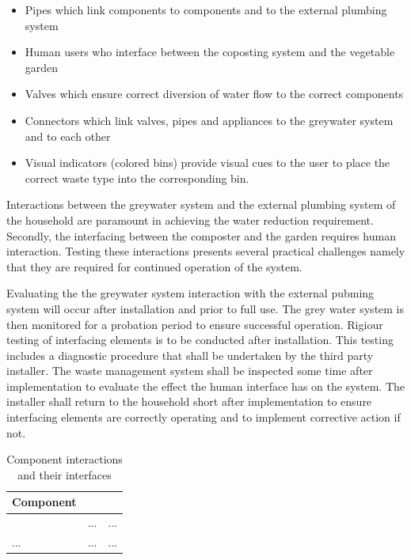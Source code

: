 \documentclass[a4paper,11pt,fleqn]{report}
\begin{document}
\begin{itemize}
\item Pipes which link components to components and to the external plumbing system
\item Human users who interface between the coposting system and the vegetable garden
\item Valves which ensure correct diversion of water flow to the correct components
\item Connectors which link valves, pipes and appliances to the greywater system and to each other
\item Visual indicators (colored bins) provide visual cues to the user to place the correct waste type into the corresponding bin.
\end{itemize}

Interactions between the greywater system and the external plumbing system of the household are paramount in achieving the water reduction requirement. Secondly, the interfacing between the composter and the garden requires human interaction. Testing these interactions presents several practical challenges namely that they are required for continued operation of the system. 

Evaluating the the greywater system interaction with the external pubming system will occur after installation and prior to full use. The grey water system is then monitored for a probation period to ensure successful operation. Rigiour testing of interfacing elements is to be conducted after installation. This testing includes a diagnostic procedure that shall be undertaken by the third party installer. The waste management system shall be inspected some time after implementation to evaluate the effect the human interface has on the system. The installer shall return to the household short after implementation to ensure interfacing elements are correctly operating and to implement corrective action if not.

\begin{table}[h!]
\caption {Component interactions and their interfaces} \label{tb: Components & interfaces} 
\begin{center}
\begin{tabular}{p{4cm}|p{4cm}|p{4cm}}\toprule
	{\textbf{Component}} & {\textbf{Interactions and Interfaces} & {\textbf{Interface}\\ \midrule
    \textcolor{Format used by sample project} & ... & ...\\
    \hline
    ... & ... & ...\\

    \bottomrule
\end{tabular}
\end{center}
\end{table}
\end{document}

